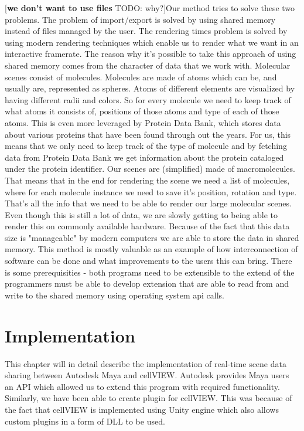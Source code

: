 \documentclass[
  digital, %
  table,   %
  nolof,     %
  nolot,     %
]{fithesis3}
\begin{document}
[\textbf{we don't want to use files} TODO: why?]Our method tries to solve these two problems. The problem of import/export is solved by using shared memory instead of files managed by the user. The rendering times problem is solved by using modern rendering techniques which enable us to render what we want in an interactive framerate.
The reason why it's possible to take this approach of using shared memory comes from the character of data that we work with. Molecular scenes consist of molecules. Molecules are made of atoms which can be, and usually are, represented as spheres. Atoms of different elements are visualized by having different radii and colors. So for every molecule we need to keep track of what atoms it consists of, positions of those atoms and type of each of those atoms. This is even more leveraged by Protein Data Bank, which stores data about various proteins that have been found through out the years. For us, this means that we only need to keep track of the type of molecule and by fetching data from Protein Data Bank we get information about the protein cataloged under the protein identifier. Our scenes are (simplified) made of macromolecules. That means that in the end for rendering the scene we need a list of molecules, where for each molecule instance we need to save it's position, rotation and type. That's all the info that we need to be able to render our large molecular scenes. Even though this is still a lot of data, we are slowly getting to being able to render this on commonly available hardware. Because of the fact that this data size is "manageable" by modern computers we are able to store the data in shared memory.
This method is mostly valuable as an example of how interconnection of software can be done and what improvements to the users this can bring. There is some prerequisities - both programs need to be extensible to the extend of the programmers must be able to develop extension that are able to read from and write to the shared memory using operating system api calls.

\chapter{Implementation}
\label{chap:implementation}

This chapter will in detail describe the implementation of real-time scene data sharing between Autodesk Maya and cellVIEW. Autodesk provides Maya users an API which allowed us to extend this program with required functionality. Similarly, we have been able to create plugin for cellVIEW. This was because of the fact that cellVIEW is implemented using Unity engine which also allows custom plugins in a form of DLL to be used.
\end{document}
